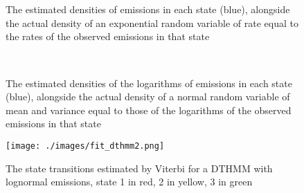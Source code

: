 \begin{figure}
\centering
{}
 \\

 \\
\caption{The estimated densities of emissions in each state (blue), alongside the actual density of an exponential random variable of rate equal to the rates of the observed emissions in that state}
\label{densities_mmpp1}
\end{figure}

\begin{figure}
\centering
{}
 \\

\caption{The estimated densities of the logarithms of emissions in each state (blue), alongside the actual density of a normal random variable of mean and variance equal to those of the logarithms of the observed emissions in that state}
\label{densities_mmpp3}
\end{figure}

\begin{figure}
\centering
\texttt{[image: ./images/fit\_dthmm2.png]}
\caption{The state transitions estimated by Viterbi for a DTHMM with lognormal emissions, state 1 in red, 2 in yellow, 3 in green}
\label{fit_dthmm2}
\end{figure}

